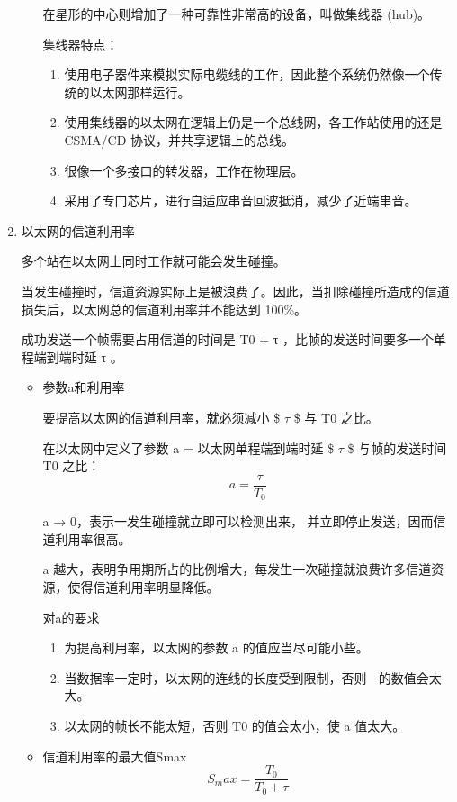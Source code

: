 \documentclass[11pt]{article}
\begin{document}
\begin{enumerate}
\begin{enumerate}
在星形的中心则增加了一种可靠性非常高的设备，叫做集线器 (hub)。

集线器特点：
\begin{enumerate}
\item 使用电子器件来模拟实际电缆线的工作，因此整个系统仍然像一个传统的以太网那样运行。
\item 使用集线器的以太网在逻辑上仍是一个总线网，各工作站使用的还是 CSMA/CD 协议，并共享逻辑上的总线。
\item 很像一个多接口的转发器，工作在物理层。
\item 采用了专门芯片，进行自适应串音回波抵消，减少了近端串音。
\end{enumerate}
\end{enumerate}
\item 以太网的信道利用率
\label{sec:org86c7027}

多个站在以太网上同时工作就可能会发生碰撞。

当发生碰撞时，信道资源实际上是被浪费了。因此，当扣除碰撞所造成的信道损失后，以太网总的信道利用率并不能达到 100\%。

成功发送一个帧需要占用信道的时间是 T0 + τ ，比帧的发送时间要多一个单程端到端时延 τ 。

\begin{itemize}
\item 参数a和利用率

要提高以太网的信道利用率，就必须减小 \$ \(\tau\) \$ 与 T0 之比。

在以太网中定义了参数 a = 以太网单程端到端时延 \$ \(\tau\) \$ 与帧的发送时间 T0 之比：
\[
    a = \frac{ \tau }{T_0}
  \]

a → 0，表示一发生碰撞就立即可以检测出来， 并立即停止发送，因而信道利用率很高。

a 越大，表明争用期所占的比例增大，每发生一次碰撞就浪费许多信道资源，使得信道利用率明显降低。

对a的要求
\begin{enumerate}
\item 为提高利用率，以太网的参数 a 的值应当尽可能小些。

\item 当数据率一定时，以太网的连线的长度受到限制，否则   的数值会太大。

\item 以太网的帧长不能太短，否则 T0 的值会太小，使 a 值太大。
\end{enumerate}

\item 信道利用率的最大值Smax
\[
    S_max=\frac{T_0}{T_0 + \tau}
  \]


\end{itemize}
\end{enumerate}
\end{document}
